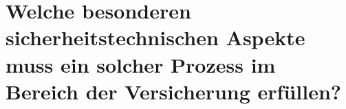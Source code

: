 \chapter{Welche besonderen sicherheitstechnischen Aspekte muss ein solcher Prozess im Bereich der Versicherung erfüllen?} \label{ff3}